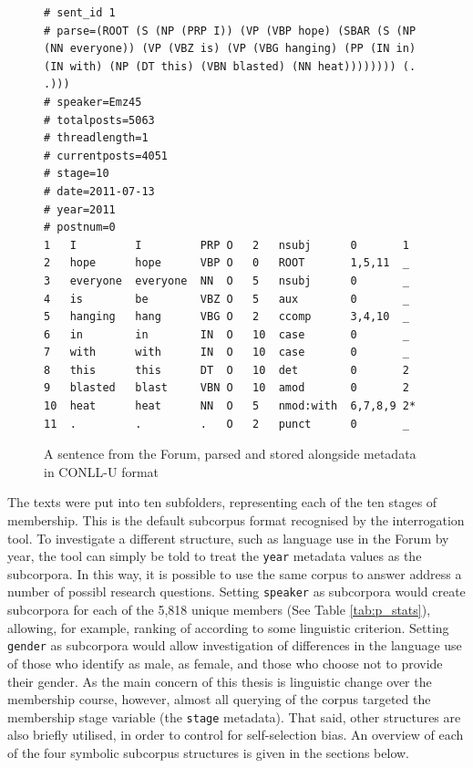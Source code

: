 \begin{figure}[htb]
\begin{verbatim}
# sent_id 1
# parse=(ROOT (S (NP (PRP I)) (VP (VBP hope) (SBAR (S (NP (NN everyone)) (VP (VBZ is) (VP (VBG hanging) (PP (IN in) (IN with) (NP (DT this) (VBN blasted) (NN heat)))))))) (. .)))
# speaker=Emz45
# totalposts=5063
# threadlength=1
# currentposts=4051
# stage=10
# date=2011-07-13
# year=2011
# postnum=0
1   I         I         PRP O   2   nsubj      0       1
2   hope      hope      VBP O   0   ROOT       1,5,11  _
3   everyone  everyone  NN  O   5   nsubj      0       _
4   is        be        VBZ O   5   aux        0       _
5   hanging   hang      VBG O   2   ccomp      3,4,10  _
6   in        in        IN  O   10  case       0       _
7   with      with      IN  O   10  case       0       _
8   this      this      DT  O   10  det        0       2
9   blasted   blast     VBN O   10  amod       0       2
10  heat      heat      NN  O   5   nmod:with  6,7,8,9 2*
11  .         .         .   O   2   punct      0       _
\end{verbatim}
\caption[A parsed sentence with metadata]{A sentence from the Forum, parsed and stored alongside metadata in CONLL-U format}
\label{fig:parsed-text}
\end{figure}

The texts were put into ten subfolders, representing each of the ten stages of membership. This is the default subcorpus format recognised by the interrogation tool. To investigate a different structure, such as language use in the \gls{Forum} by year, the tool can simply be told to treat the \texttt{year} metadata values as the subcorpora. In this way, it is possible to use the same \gls{corpus} to answer address a number of possibl research questions. Setting \texttt{speaker} as subcorpora would create subcorpora for each of the 5,818 unique members (See Table \ref{tab:p_stats}), allowing, for example, ranking of  according to some linguistic criterion. Setting \texttt{gender} as subcorpora would allow investigation of differences in the language use of those who identify as male, as female, and those who choose not to provide their gender. As the main concern of this thesis is linguistic change over the membership course, however, almost all querying of the corpus targeted the membership stage variable (the \texttt{stage} metadata). That said, other structures are also briefly utilised, in order to control for self\hyp{}selection bias. An overview of each of the four symbolic subcorpus structures is given in the sections below.

